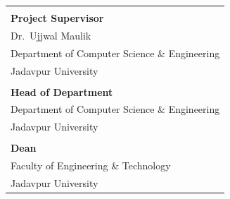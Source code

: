 \documentclass[12pt,a4paper,titlepage]{article}
\begin{document}
\begin{titlepage}
    \begin{tabular}{p{}}
        \hline \\[-0.6em]
        \textbf{Project Supervisor} \\
        Dr.\ Ujjwal Maulik \\
        Department of Computer Science \& Engineering \\
        Jadavpur University \\[1.0cm]
        \hline \\[-0.6em]
        \textbf{Head of Department} \\
        Department of Computer Science \& Engineering \\
        Jadavpur University \\[1.0cm]
        \hline \\[-0.6em]
        \textbf{Dean} \\
        Faculty of Engineering \& Technology \\
        Jadavpur University \\
    \end{tabular}
    
    
    \vspace{1.2cm}
    
\end{titlepage}
\end{document}
